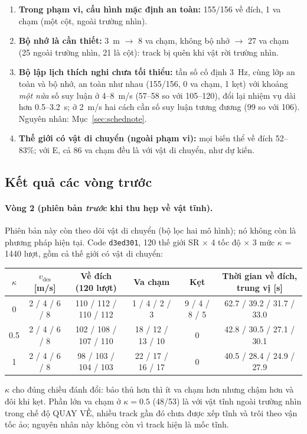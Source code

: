 \documentclass[11pt,a4paper]{article}
\numberwithin{equation}{section}
\newcommand{\code}[1]{\texttt{\small #1}}
\theoremstyle{definition}
\theoremstyle{plain}
\theoremstyle{remark}
\begin{document}
\begin{enumerate}
\item \textbf{Trong phạm vi, cấu hình mặc định an toàn:} 155/156 về đích, 1 va chạm (một cột, ngoài trường nhìn).
\item \textbf{Bộ nhớ là cần thiết:} 3~m $\to$ 8 va chạm, không bộ nhớ $\to$ 27 va chạm (25 ngoài trường nhìn, 21 là cột): track bị quên khi vật rời trường nhìn.
\item \textbf{Bộ lập lịch thích nghi chưa tối thiểu:} tần số cố định 3~Hz, cùng lớp an toàn và bộ nhớ, an toàn như nhau (155/156, 0 va chạm, 1 kẹt) với khoảng \emph{một nửa} số suy luận ở 4--8~m/s (57--58 so với 105--120), đổi lại nhiệm vụ dài hơn 0.5--3.2~s; ở 2~m/s hai cách cần số suy luận tương đương (99 so với 106). Nguyên nhân: Mục~\ref{sec:schednote}.
\item \textbf{Thế giới có vật di chuyển (ngoài phạm vi):} mọi biến thể về đích 52--83\%; với E, cả 86 va chạm đều là với vật di chuyển, như dự kiến.
\end{enumerate}

\subsection{Kết quả các vòng trước}
\paragraph{Vòng 2 (phiên bản \emph{trước} khi thu hẹp về vật tĩnh).} Phiên bản này còn theo dõi vật di chuyển (bộ lọc hai mô hình); nó không còn là phương pháp hiện tại. Code \code{d3ed301}, 120 thế giới SR $\times$ 4 tốc độ $\times$ 3 mức $\kappa$ = 1440 lượt, gồm cả thế giới có vật di chuyển:
\begin{center}\footnotesize
\begin{tabular}{@{}cccccc@{}}
\toprule
$\kappa$ & $v_{\text{des}}$ [m/s] & Về đích (120 lượt) & Va chạm & Kẹt & Thời gian về đích, trung vị [s] \\ \midrule
0 & 2 / 4 / 6 / 8 & 110 / 112 / 110 / 112 & 1 / 4 / 2 / 3 & 9 / 4 / 8 / 5 & 62.7 / 39.2 / 31.7 / 33.0 \\
0.5 & 2 / 4 / 6 / 8 & 102 / 108 / 107 / 110 & 18 / 12 / 13 / 10 & 0 & 42.8 / 30.5 / 27.1 / 30.1 \\
1 & 2 / 4 / 6 / 8 & 98 / 103 / 104 / 103 & 22 / 17 / 16 / 17 & 0 & 40.5 / 28.4 / 24.9 / 27.9 \\
\bottomrule
\end{tabular}
\end{center}
$\kappa$ cho đúng chiều đánh đổi: bảo thủ hơn thì ít va chạm hơn nhưng chậm hơn và đôi khi kẹt. Phần lớn va chạm ở $\kappa=0.5$ (48/53) là với vật tĩnh ngoài trường nhìn trong chế độ QUAY VỀ, nhiều track gần đó chưa được xếp tĩnh và trôi theo vận tốc ảo; nguyên nhân này không còn vì track hiện là mốc tĩnh.
\end{document}
